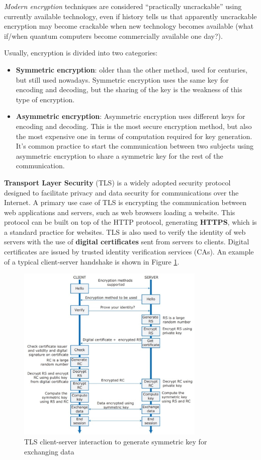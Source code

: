 \textit{Modern encryption} techniques are considered “practically uncrackable” using currently available technology, even if history tells us that apparently uncrackable encryption may become crackable when new technology becomes available (what if/when quantum computers become commercially available one day?).

\noindent Usually, encryption is divided into two categories:

\begin{itemize}
    \item \textbf{Symmetric encryption}: older than the other method, used for centuries, but still used nowadays. Symmetric encryption uses the same key for encoding and decoding, but the sharing of the key is the weakness of this type of encryption.
    \item \textbf{Asymmetric encryption}: Asymmetric encryption uses different keys for encoding and decoding. This is the most secure encryption method, but also the most expensive one in terms of computation required for key generation. It's common practice to start the communication between two subjects using asymmetric encryption to share a symmetric key for the rest of the communication. 
\end{itemize}

\noindent\textbf{Transport Layer Security} (TLS) is a widely adopted security protocol designed to facilitate privacy and data security for communications over the Internet. A primary use case of TLS is encrypting the communication between web applications and servers, such as web browsers loading a website. This protocol can be built on top of the HTTP protocol, generating \textbf{HTTPS}, which is a standard practice for websites. TLS is also used to verify the identity of web servers with the use of \textbf{digital certificates} sent from servers to clients. Digital certificates are issued by trusted identity verification services (CAs). An example of a typical client-server handshake is shown in Figure \ref{fig:TLS}.

\begin{figure} [H]
    \centering
    \includegraphics[width=0.8\textwidth]{images/Security/TLS.png}
    \caption{TLS client-server interaction to generate symmetric key for exchanging data}
    \label{fig:TLS}
\end{figure} 


